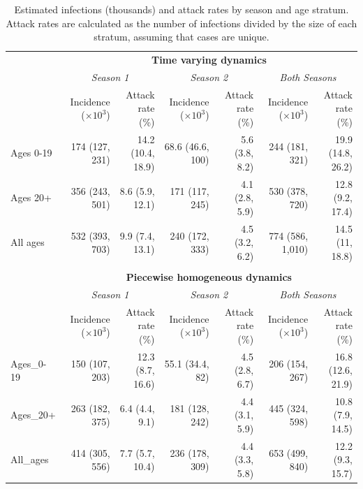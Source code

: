 \begin{table}
	\caption[Estimated A(H1N1) infections and attack rates by season and age stratum.]{Estimated infections (thousands) and attack rates by season and age stratum. Attack rates are calculated as the number of infections divided by the size of each stratum, assuming that cases are unique.}
	\label{tab:flu_attack_rates}
	\centering\footnotesize
	\begin{tabular}{lrrrrrr}
		\hline
		&\multicolumn{6}{c}{\textbf{Time varying dynamics}}\\
		\cmidrule{2-7} & \multicolumn{2}{c}{\textit{Season 1}} & \multicolumn{2}{c}{\textit{Season 2}} & \multicolumn{2}{c}{\textit{Both Seasons}}\\
		\cmidrule(r){2-3}\cmidrule(lr){4-5}\cmidrule(l){6-7} & 
		Incidence ($ \times10^3 $) & Attack rate (\%) & Incidence ($ \times10^3 $)& Attack rate (\%) & Incidence ($ \times10^3 $) & Attack rate (\%)\\
		\hline
	Ages 0-19 & 174 (127, 231) & 14.2 (10.4, 18.9) & 68.6 (46.6, 100) & 5.6 (3.8, 8.2) & 244 (181, 321) & 19.9 (14.8, 26.2)\\
	Ages 20+ & 356 (243, 501) & 8.6 (5.9, 12.1) & 171 (117, 245) & 4.1 (2.8, 5.9) & 530 (378, 720) & 12.8 (9.2, 17.4)\\
	All ages & 532 (393, 703) & 9.9 (7.4, 13.1) & 240 (172, 333) & 4.5 (3.2, 6.2) & 774 (586, 1,010) & 14.5 (11, 18.8)\\
		\hline &&&&&&\\
		&\multicolumn{6}{c}{\textbf{Piecewise homogeneous dynamics}}\\
		\cmidrule{2-7}	& \multicolumn{2}{c}{\textit{Season 1}} & \multicolumn{2}{c}{\textit{Season 2}} & \multicolumn{2}{c}{\textit{Both Seasons}}\\
	\cmidrule(r){2-3}\cmidrule(lr){4-5}\cmidrule(l){6-7} & 
	Incidence ($ \times10^3 $) & Attack rate (\%)& Incidence ($ \times10^3 $) & Attack rate (\%)& Incidence ($ \times10^3 $) & Attack rate (\%)\\
	\hline
	Ages\_0-19 & 150 (107, 203) & 12.3 (8.7, 16.6) & 55.1 (34.4, 82) & 4.5 (2.8, 6.7) & 206 (154, 267) & 16.8 (12.6, 21.9)\\
	Ages\_20+ & 263 (182, 375) & 6.4 (4.4, 9.1) & 181 (128, 242) & 4.4 (3.1, 5.9) & 445 (324, 598) & 10.8 (7.9, 14.5)\\
	All\_ages & 414 (305, 556) & 7.7 (5.7, 10.4) & 236 (178, 309) & 4.4 (3.3, 5.8) & 653 (499, 840) & 12.2 (9.3, 15.7)\\
		\hline
	\end{tabular}
\end{table}

